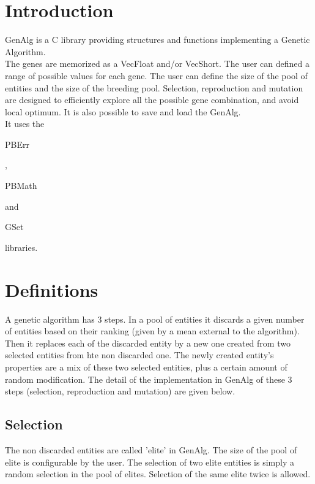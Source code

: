 \section*{Introduction}

GenAlg is a C library providing structures and functions implementing a Genetic Algorithm.\\ 

The genes are memorized as a VecFloat and/or VecShort. The user can defined a range of possible values for each gene. The user can define the size of the pool of entities and the size of the breeding pool. Selection, reproduction and mutation are designed to efficiently explore all the possible gene combination, and avoid local optimum. It is also possible to save and load the GenAlg.\\

It uses the \begin{ttfamily}PBErr\end{ttfamily}, \begin{ttfamily}PBMath\end{ttfamily} and \begin{ttfamily}GSet\end{ttfamily} libraries.\\

\section{Definitions}

A genetic algorithm has 3 steps. In a pool of entities it discards a given number of entities based on their ranking (given by a mean external to the algorithm). Then it replaces each of the discarded entity by a new one created from two selected entities from hte non discarded one. The newly created entity's properties are a mix of these two selected entities, plus a certain amount of random modification. The detail of the implementation in GenAlg of these 3 steps (selection, reproduction and mutation) are given below.\\

\subsection{Selection}

The non discarded entities are called 'elite' in GenAlg. The size of the pool of elite is configurable by the user. The selection of two elite entities is simply a random selection in the pool of elites. Selection of the same elite twice is allowed.\\


